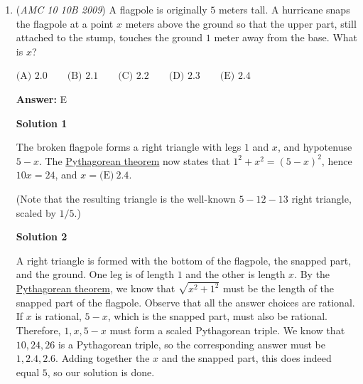 \begin{enumerate}
$\text{(A) } 52.5 \qquad \text{(B) } 55 \qquad \text{(C) } 57.5 \qquad \text{(D) } 60 \qquad \text{(E) } 62.5$

 \textbf{Answer: }A



\textbf{Solution}

$\triangle ABC$ is isosceles, hence $\angle ACB = \angle CAB$. 

 The sum of internal angles of $\triangle ABC$ can now be expressed as $\angle B + \frac 52 \angle B + \frac 52 \angle B = 6\angle B$, hence $\angle B = 30^\circ$, and each of the other two angles is $75^\circ$. 

 Now we know that $\angle DCE = \angle ACB = 75^\circ$.

 Finally, $\triangle CDE$ is isosceles, hence each of the two remaining angles ($\angle D$ and $\angle E$) is equal to $\frac{180^\circ - 75^\circ}2 = \frac{105^\circ}2 = \boxed{\text{(A)}\ 52.5}$.

 


	\item (\textit{AMC 10 10B 2009}) A flagpole is originally $5$ meters tall. A hurricane snaps the flagpole at a point $x$ meters above the ground so that the upper part, still attached to the stump, touches the ground $1$ meter away from the base. What is $x$?


 $\text{(A) } 2.0 \qquad \text{(B) } 2.1 \qquad \text{(C) } 2.2 \qquad \text{(D) } 2.3 \qquad \text{(E) } 2.4$

 \textbf{Answer: }E



\textbf{Solution 1}

The broken flagpole forms a right triangle with legs $1$ and $x$, and hypotenuse $5-x$. The \href{https://artofproblemsolving.com/wiki/index.php?title=Pythagorean\_theorem}{Pythagorean theorem} now states that $1^2 + x^2 = (5-x)^2$, hence $10x = 24$, and $x=\boxed{\text{(E)}\ 2.4}$.

 (Note that the resulting triangle is the well-known $5-12-13$ right triangle, scaled by $1/5$.)

 



\textbf{Solution 2}

A right triangle is formed with the bottom of the flagpole, the snapped part, and the ground. One leg is of length $1$ and the other is length $x$. By the \href{https://artofproblemsolving.com/wiki/index.php?title=Pythagorean\_theorem}{Pythagorean theorem}, we know that $\sqrt{x^2+1^2}$ must be the length of the snapped part of the flagpole. Observe that all the answer choices are rational. If $x$ is rational, $5-x$, which is the snapped part, must also be rational. Therefore, $1, x, 5-x$ must form a scaled Pythagorean triple. We know that $10, 24, 26$ is a Pythagorean triple, so the corresponding answer must be $1, 2.4, 2.6$. Adding together the $x$ and the snapped part, this does indeed equal $5$, so our solution is done.


\end{enumerate}
